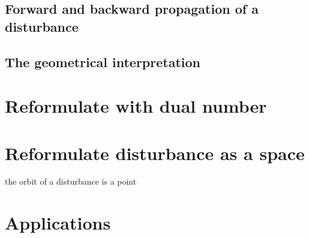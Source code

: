 \documentclass{article}
\begin{document}
\subsection{Forward and backward propagation of a disturbance}

\subsection{The geometrical interpretation}

\section{Reformulate with dual number}

\section{Reformulate disturbance as a space}

the orbit of a disturbance is a point

\section{Applications}



\end{document}
